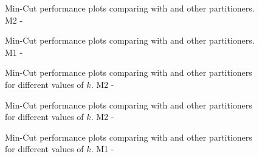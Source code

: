 \begin{figure}
\centering
\caption{Min-Cut performance plots comparing  with  and
         other partitioners. \textsc{M2} - \BoykovKolmogorov}
\label{fig:final_flow}
\end{figure} 

\begin{figure}
\centering
\caption{Min-Cut performance plots comparing  with  and
         other partitioners. \textsc{M1} - \GoldbergTarjan}
\label{fig:final_flow}
\end{figure} 

\begin{figure}
\centering
\caption{Min-Cut performance plots comparing  with  and
         other partitioners for different values of $k$. \textsc{M2} - \IBFS}
\label{fig:final_flow_k}
\end{figure}

\begin{figure}
\centering
\caption{Min-Cut performance plots comparing  with  and
         other partitioners for different values of $k$. \textsc{M2} - \BoykovKolmogorov}
\label{fig:final_flow_k}
\end{figure}

\begin{figure}
\centering
\caption{Min-Cut performance plots comparing  with  and
         other partitioners for different values of $k$. \textsc{M1} - \GoldbergTarjan}
\label{fig:final_flow_k}
\end{figure}